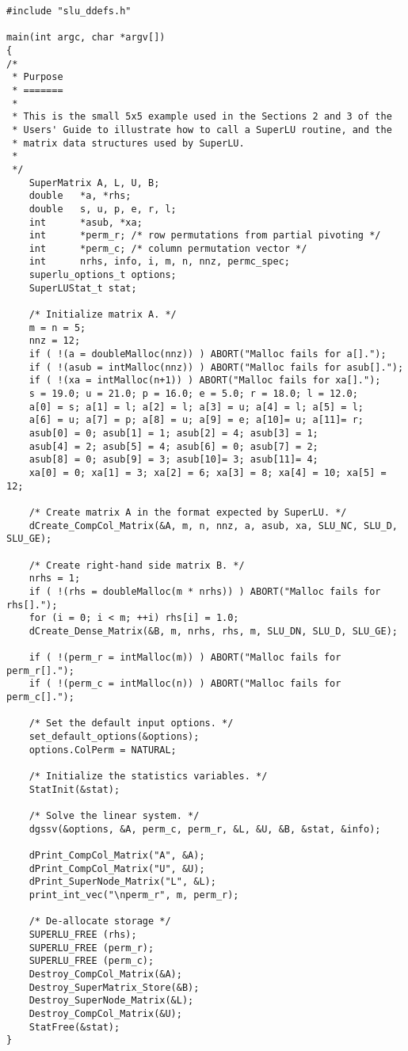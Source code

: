 \begin{verbatim}
#include "slu_ddefs.h"

main(int argc, char *argv[])
{
/*
 * Purpose
 * =======
 * 
 * This is the small 5x5 example used in the Sections 2 and 3 of the 
 * Users' Guide to illustrate how to call a SuperLU routine, and the
 * matrix data structures used by SuperLU.
 *
 */
    SuperMatrix A, L, U, B;
    double   *a, *rhs;
    double   s, u, p, e, r, l;
    int      *asub, *xa;
    int      *perm_r; /* row permutations from partial pivoting */
    int      *perm_c; /* column permutation vector */
    int      nrhs, info, i, m, n, nnz, permc_spec;
    superlu_options_t options;
    SuperLUStat_t stat;

    /* Initialize matrix A. */
    m = n = 5;
    nnz = 12;
    if ( !(a = doubleMalloc(nnz)) ) ABORT("Malloc fails for a[].");
    if ( !(asub = intMalloc(nnz)) ) ABORT("Malloc fails for asub[].");
    if ( !(xa = intMalloc(n+1)) ) ABORT("Malloc fails for xa[].");
    s = 19.0; u = 21.0; p = 16.0; e = 5.0; r = 18.0; l = 12.0;
    a[0] = s; a[1] = l; a[2] = l; a[3] = u; a[4] = l; a[5] = l;
    a[6] = u; a[7] = p; a[8] = u; a[9] = e; a[10]= u; a[11]= r;
    asub[0] = 0; asub[1] = 1; asub[2] = 4; asub[3] = 1;
    asub[4] = 2; asub[5] = 4; asub[6] = 0; asub[7] = 2;
    asub[8] = 0; asub[9] = 3; asub[10]= 3; asub[11]= 4;
    xa[0] = 0; xa[1] = 3; xa[2] = 6; xa[3] = 8; xa[4] = 10; xa[5] = 12;

    /* Create matrix A in the format expected by SuperLU. */
    dCreate_CompCol_Matrix(&A, m, n, nnz, a, asub, xa, SLU_NC, SLU_D, SLU_GE);
    
    /* Create right-hand side matrix B. */
    nrhs = 1;
    if ( !(rhs = doubleMalloc(m * nrhs)) ) ABORT("Malloc fails for rhs[].");
    for (i = 0; i < m; ++i) rhs[i] = 1.0;
    dCreate_Dense_Matrix(&B, m, nrhs, rhs, m, SLU_DN, SLU_D, SLU_GE);

    if ( !(perm_r = intMalloc(m)) ) ABORT("Malloc fails for perm_r[].");
    if ( !(perm_c = intMalloc(n)) ) ABORT("Malloc fails for perm_c[].");

    /* Set the default input options. */
    set_default_options(&options);
    options.ColPerm = NATURAL;

    /* Initialize the statistics variables. */
    StatInit(&stat);

    /* Solve the linear system. */
    dgssv(&options, &A, perm_c, perm_r, &L, &U, &B, &stat, &info);
    
    dPrint_CompCol_Matrix("A", &A);
    dPrint_CompCol_Matrix("U", &U);
    dPrint_SuperNode_Matrix("L", &L);
    print_int_vec("\nperm_r", m, perm_r);

    /* De-allocate storage */
    SUPERLU_FREE (rhs);
    SUPERLU_FREE (perm_r);
    SUPERLU_FREE (perm_c);
    Destroy_CompCol_Matrix(&A);
    Destroy_SuperMatrix_Store(&B);
    Destroy_SuperNode_Matrix(&L);
    Destroy_CompCol_Matrix(&U);
    StatFree(&stat);
}
\end{verbatim}


